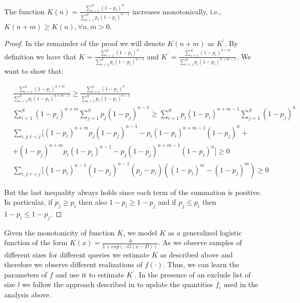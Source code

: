 \begin{lemma}
\label{monotonicity}
The function $K(n) = \frac{\sum_{i=1}^S (1-p_i)^n}{\sum_{i=1}^S p_i(1-p_i)^{n-1}}$ increases monotonically, i.e., $K(n+m) \geq K(n), \forall n,m > 0$.
\end{lemma}
\iftr
\begin{proof}
In the remainder of the proof we will denote $K(n+m)$ as $K^{\prime}$. By definition we have that $K = \frac{\sum_{i=1}^S (1-p_i)^n}{\sum_{i=1}^S p_i(1-p_i)^{n-1}}$ and $K^{\prime} = \frac{\sum_{i=1}^S (1-p_i)^{n+m}}{\sum_{i=1}^S p_i(1-p_i)^{n+m-1}}$. We want to show that:

{\small
\begin{align}
&\frac{\sum_{i=1}^S (1-p_i)^{n+m}}{\sum_{i=1}^S p_i(1-p_i)^{n+m-1}} \geq \frac{\sum_{i=1}^S (1-p_i)^n}{\sum_{i=1}^S p_i(1-p_i)^{n-1}} \nonumber \\
&\sum_{i=1}^S (1-p_i)^{n+m}\sum_{j=1}^S p_j(1-p_j)^{n-1} \geq \sum_{i=1}^S p_i(1-p_i)^{n+m-1}\sum_{j=1}^S (1-p_j)^n\nonumber \\
&\sum_{i,j:i\prec j}[(1-p_i)^{n+m}p_j(1-p_j)^{n-1} - p_i(1-p_i)^{n+m-1}(1-p_j)^n + \nonumber \\
& + (1-p_j)^{n+m}p_i(1-p_i)^{n-1} - p_j(1-p_j)^{n+m-1}(1-p_i)^n] \geq 0 \nonumber \\
&\sum_{i,j:i\prec j}[(1-p_i)^{n-1}(1-p_j)^{n-1}(p_j-p_i)((1-p_i)^{m} - (1-p_j)^{m}) \geq 0
\end{align}}

But the last inequality always holds since each term of the summation is positive. In particular, if $p_j \geq p_i$ then
also $1-p_i \geq 1-p_j$ and if $p_j \leq p_i$ then $1-p_i \leq 1-p_j$.
\end{proof}
\fi
Given the monotonicity of function $K$, we model $K$ as a generalized logistic function of the form $K(x) = \frac{A}{1+exp(-G(x-D))}$. As we observe samples of different sizes for different queries we estimate $K$ as described above and therefore we observe different realizations of $f(\cdot)$. Thus, we can learn the parameters of $f$ and use it to estimate $K^{\prime}$. In the presence of an exclude list of size $l$ we follow the approach described in  to update the quantities $f_i$ used in the analysis above. 

